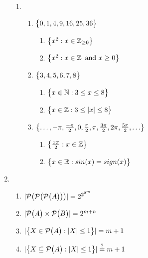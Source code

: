 \begin{enumerate}
\begin{enumerate}[label=(\alph*), itemsep=16pt]
                  \item
                        \begin{enumerate}[label=(\roman*), itemsep=10pt]
                              \item $\bigl\{ {0, 1, 4, 9, 16, 25, 36} \bigr\}$ \vspace*{0.2cm}
                                    \begin{enumerate}[label=(\arabic*)]
                                          \item $\bigl\{ { x^2 : x \in \operatorname{\mathbb{Z}}_{\geq 0} } \bigr\}$
                                          \item $\bigl\{ { x^2 : x \in \operatorname{\mathbb{Z}} \text{ and } x \geq 0 } \bigr\}$
                                    \end{enumerate}
                              \item $\bigl\{ {3, 4, 5, 6, 7, 8} \bigr\}$ \vspace*{0.2cm}
                                    \begin{enumerate}[label=(\arabic*)]
                                          \item $\bigl\{ { x \in \operatorname{\mathbb{N}} : 3 \leq x \leq 8 } \bigr\}$
                                          \item $\bigl\{ { x \in \operatorname{\mathbb{Z}} : 3 \leq \lvert {x} \rvert \leq 8 } \bigr\}$
                                    \end{enumerate}
                              \item $\bigl\{ {\ldots, -\pi, \frac{-\pi}{2}, 0, \frac{\pi}{2}, \pi, \frac{3\pi}{2}, 2\pi, \frac{5\pi}{2}, \ldots} \bigr\}$ \vspace*{0.2cm}
                                    \begin{enumerate}[label=(\arabic*)]
                                          \item $\bigl\{ { \frac{x\pi}{2} : x \in \operatorname{\mathbb{Z}} } \bigr\}$
                                          \item $\bigl\{ { x \in \mathbb{R} : sin(x) = sign(x)} \bigr\}$
                                    \end{enumerate}
                        \end{enumerate}
            \end{enumerate}

      \item
            \begin{enumerate}[label=(\alph*), itemsep=10pt]
                  \item $\lvert {\mathcal{P}\bigl( {\mathcal{P}\bigl( {\mathcal{P}\bigl( {A} \bigr)} \bigr)} \bigr)} \rvert = 2^{2^{2^m}}$
                  \item $\lvert {\mathcal{P}\bigl( {A} \bigr)\times\mathcal{P}\bigl( {B} \bigr)} \rvert = 2^{m + n}$
                  \item $\lvert {\bigl\{ {X \in \mathcal{P}\bigl( {A} \bigr) : \lvert {X} \rvert \leq 1} \bigr\}} \rvert = m + 1$
                  \item $\lvert {\bigl\{ {X \subseteq \mathcal{P}\bigl( {A} \bigr) : \lvert {X} \rvert \leq 1} \bigr\}} \rvert \stackrel{?}{=} m + 1$
            \end{enumerate}


\end{enumerate}
